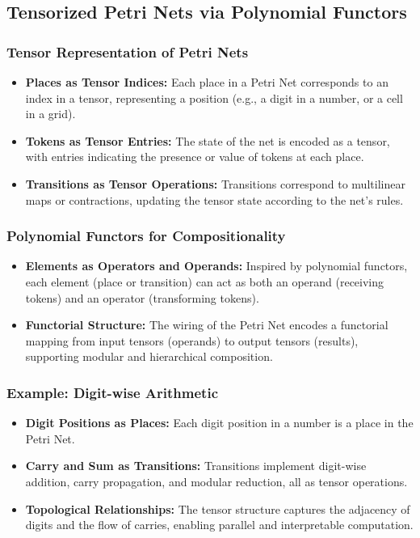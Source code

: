 \label{sec:methodology}

\subsection{Tensorized Petri Nets via Polynomial Functors}

\subsubsection{Tensor Representation of Petri Nets}

\begin{itemize}
    \item \textbf{Places as Tensor Indices:} Each place in a Petri Net corresponds to an index in a tensor, representing a position (e.g., a digit in a number, or a cell in a grid).
    \item \textbf{Tokens as Tensor Entries:} The state of the net is encoded as a tensor, with entries indicating the presence or value of tokens at each place.
    \item \textbf{Transitions as Tensor Operations:} Transitions correspond to multilinear maps or contractions, updating the tensor state according to the net’s rules.
\end{itemize}

\subsubsection{Polynomial Functors for Compositionality}

\begin{itemize}
    \item \textbf{Elements as Operators and Operands:} Inspired by polynomial functors, each element (place or transition) can act as both an operand (receiving tokens) and an operator (transforming tokens).
    \item \textbf{Functorial Structure:} The wiring of the Petri Net encodes a functorial mapping from input tensors (operands) to output tensors (results), supporting modular and hierarchical composition.
\end{itemize}

\subsubsection{Example: Digit-wise Arithmetic}

\begin{itemize}
    \item \textbf{Digit Positions as Places:} Each digit position in a number is a place in the Petri Net.
    \item \textbf{Carry and Sum as Transitions:} Transitions implement digit-wise addition, carry propagation, and modular reduction, all as tensor operations.
    \item \textbf{Topological Relationships:} The tensor structure captures the adjacency of digits and the flow of carries, enabling parallel and interpretable computation.
\end{itemize}

